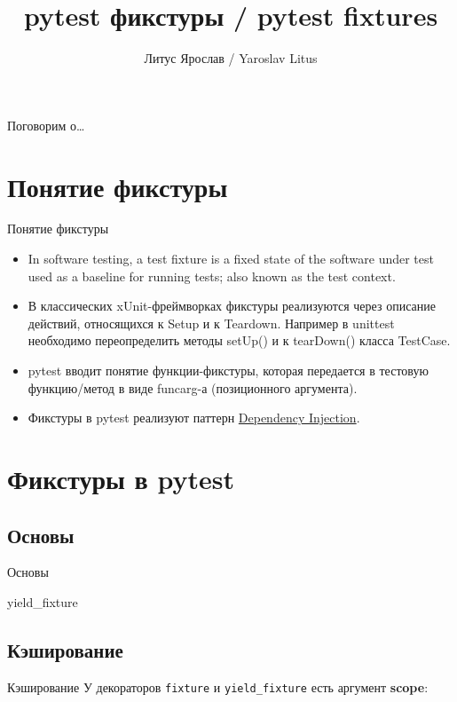 \documentclass{beamer}
\title{pytest фикстуры / pytest fixtures}
\author{Литус Ярослав / Yaroslav Litus}
\institute{
	Группа тестирования поиска / search testing group \newline
	Поисковый Портал Спутник / \href{http://sputnik.ru}{sputnik.ru}
}
\date{}
\begin{document}
\begin{frame}
	\titlepage
\end{frame}

\begin{frame}{Поговорим о\ldots}
	\tableofcontents
\end{frame}

\section{Понятие фикстуры}
\begin{frame}[fragile]{Понятие фикстуры}
	\begin{itemize}
	\item In software testing, a test fixture is a fixed state of the software
	under test used as a baseline for running tests; also known as the test context.
	\pause \item В классических xUnit-фреймворках фикстуры реализуются через описание действий, относящихся к Setup и к Teardown.
	Например в unittest необходимо переопределить методы setUp() и к tearDown() класса TestCase.
	\pause \item pytest вводит понятие функции-фикстуры, которая передается в тестовую функцию/метод в виде funcarg-а (позиционного аргумента).
	\pause \item Фикстуры в pytest реализуют паттерн \href{https://en.wikipedia.org/wiki/Dependency_injection}{Dependency Injection}.
	\end{itemize}
\end{frame}

\section{Фикстуры в pytest}
\subsection{Основы}
\begin{frame}[fragile]{Основы}
\end{frame}

\begin{frame}[fragile]{yield\_fixture}
\end{frame}

\subsection{Кэширование}
\begin{frame}[fragile]{Кэширование}
	У декораторов \verb|fixture| и \verb|yield_fixture| есть аргумент \textbf{scope}:
\end{frame}
\end{document}
